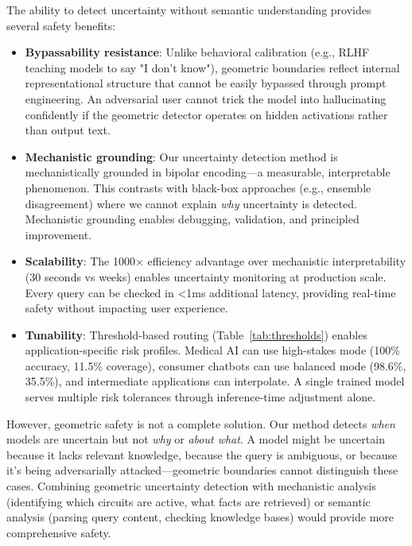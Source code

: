 \documentclass[11pt]{article}
\begin{document}
The ability to detect uncertainty without semantic understanding provides several safety benefits:

\begin{itemize}
\item \textbf{Bypassability resistance}: Unlike behavioral calibration (e.g., RLHF teaching models to say "I don't know"), geometric boundaries reflect internal representational structure that cannot be easily bypassed through prompt engineering. An adversarial user cannot trick the model into hallucinating confidently if the geometric detector operates on hidden activations rather than output text.

\item \textbf{Mechanistic grounding}: Our uncertainty detection method is mechanistically grounded in bipolar encoding—a measurable, interpretable phenomenon. This contrasts with black-box approaches (e.g., ensemble disagreement) where we cannot explain \textit{why} uncertainty is detected. Mechanistic grounding enables debugging, validation, and principled improvement.

\item \textbf{Scalability}: The 1000× efficiency advantage over mechanistic interpretability (30 seconds vs weeks) enables uncertainty monitoring at production scale. Every query can be checked in <1ms additional latency, providing real-time safety without impacting user experience.

\item \textbf{Tunability}: Threshold-based routing (Table~\ref{tab:thresholds}) enables application-specific risk profiles. Medical AI can use high-stakes mode (100\% accuracy, 11.5\% coverage), consumer chatbots can use balanced mode (98.6\%, 35.5\%), and intermediate applications can interpolate. A single trained model serves multiple risk tolerances through inference-time adjustment alone.
\end{itemize}

However, geometric safety is not a complete solution. Our method detects \textit{when} models are uncertain but not \textit{why} or \textit{about what}. A model might be uncertain because it lacks relevant knowledge, because the query is ambiguous, or because it's being adversarially attacked—geometric boundaries cannot distinguish these cases. Combining geometric uncertainty detection with mechanistic analysis (identifying which circuits are active, what facts are retrieved) or semantic analysis (parsing query content, checking knowledge bases) would provide more comprehensive safety.
\end{document}
